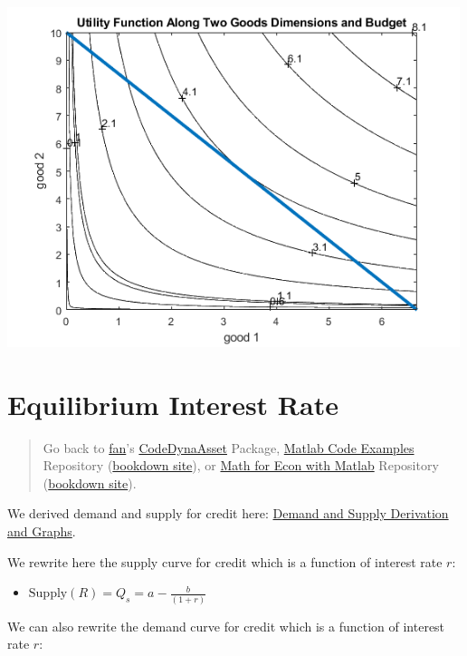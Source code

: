 \documentclass[
]{book}
\providecommand{\tightlist}{%
  \setlength{\itemsep}{0pt}\setlength{\parskip}{0pt}}
\begin{document}
\includegraphics[width=5.20833in,height=\textheight]{img/twogoods_images/figure_2.png}

\hypertarget{equilibrium-interest-rate}{%
\section{Equilibrium Interest Rate}\label{equilibrium-interest-rate}}

\begin{quote}
Go back to \href{http://fanwangecon.github.io/}{fan}'s \href{https://fanwangecon.github.io/CodeDynaAsset/}{CodeDynaAsset} Package, \href{https://fanwangecon.github.io/M4Econ/}{Matlab Code Examples} Repository (\href{https://fanwangecon.github.io/M4Econ/bookdown}{bookdown site}), or \href{https://fanwangecon.github.io/Math4Econ/}{Math for Econ with Matlab} Repository (\href{https://fanwangecon.github.io/Math4Econ/bookdown}{bookdown site}).
\end{quote}

We derived demand and supply for credit here: \href{https://fanwangecon.github.io/Math4Econ/derivative_application/K_borrow_firm.html}{Demand and Supply
Derivation and
Graphs}.

We rewrite here the supply curve for credit which is a function of
interest rate \(r\):

\begin{itemize}
\tightlist
\item
  \(\displaystyle \textrm{Supply}(R)=Q_s =a-\frac{b}{(1+r)}\)
\end{itemize}

We can also rewrite the demand curve for credit which is a function of
interest rate \(r\):
\end{document}

